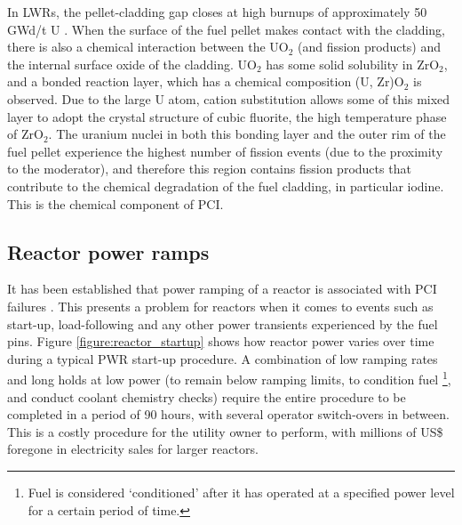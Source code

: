 In LWRs, the pellet-cladding gap closes at high burnups of approximately 50 GWd/t U \cite{Nogita1997, Suzuki2006, Rudling2008}. When the surface of the fuel pellet makes contact with the cladding, there is also a chemical interaction between the UO$_{2}$ (and fission products) and the internal surface oxide of the cladding. UO$_{2}$ has some solid solubility in ZrO$_{2}$, and a bonded reaction layer, which has a chemical composition (U, Zr)O$_{2}$ is observed. Due to the large U atom, cation substitution allows some of this mixed layer to adopt the crystal structure of cubic fluorite, the high temperature phase of ZrO$_{2}$. The uranium nuclei in both this bonding layer and the outer rim of the fuel pellet experience the highest number of fission events (due to the proximity to the moderator), and therefore this region contains fission products that contribute to the chemical degradation of the fuel cladding, in particular iodine. This is the chemical component of PCI.

\subsection{Reactor power ramps}

It has been established that power ramping of a reactor is associated with PCI failures \cite{penn1977candu, MacDonald1979, Hardy1977198, Knaab1987}. This presents a problem for reactors when it comes to events such as start-up, load-following and any other power transients experienced by the fuel pins. Figure \ref{figure:reactor_startup} shows how reactor power varies over time during a typical PWR start-up procedure. A combination of low ramping rates and long holds at low power (to remain below ramping limits, to condition fuel \cite{billaux2005pellet}\footnote{Fuel is considered `conditioned' after it has operated at a specified power level for a certain period of time.}, and conduct coolant chemistry checks) require the entire procedure to be completed in a period of 90 hours, with several operator switch-overs in between. This is a costly procedure for the utility owner to perform, with millions of US\$ foregone in electricity sales for larger reactors.

